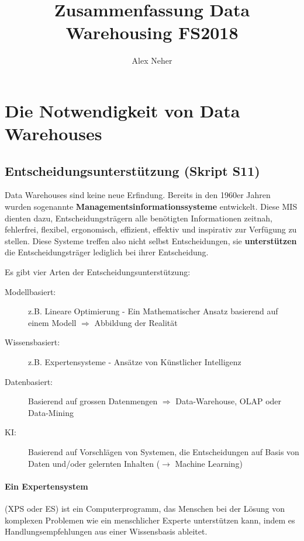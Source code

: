 \documentclass[a4paper, 11pt]{article}
\begin{document}
\title{Zusammenfassung Data Warehousing FS2018}
\author{Alex Neher}
\maketitle

\tableofcontents
\newpage

\graphicspath{{./Pictures/}}

\section{Die Notwendigkeit von Data Warehouses}
\subsection{Entscheidungsunterstützung (Skript S11)}
Data Warehouses sind keine neue Erfindung. Bereits in den 1960er Jahren wurden sogenannte \textbf{Managementsinformationssysteme} entwickelt. Diese MIS dienten dazu, Entscheidungsträgern alle benötigten Informationen zeitnah, fehlerfrei, flexibel, ergonomisch, effizient, effektiv und inspirativ zur Verfügung zu stellen. Diese Systeme treffen also nicht selbst Entscheidungen, sie \textbf{unterstützen} die Entscheidungsträger lediglich bei ihrer Entscheidung.

Es gibt vier Arten der Entscheidungsunterstützung:

\begin{description}
	\item [Modellbasiert:] z.B. Lineare Optimierung - Ein Mathematischer Ansatz basierend auf einem Modell $\Longrightarrow$ Abbildung der Realität
	\item [Wissensbasiert: ] z.B. Expertensysteme - Ansätze von Künstlicher Intelligenz
	\item [Datenbasiert: ] Basierend auf grossen Datenmengen $\Longrightarrow$ Data-Warehouse, OLAP oder Data-Mining
	\item [KI: ] Basierend auf Vorschlägen von Systemen, die Entscheidungen auf Basis von Daten und/oder gelernten Inhalten ($\longrightarrow$ Machine Learning)
\end{description}


\paragraph{Ein Expertensystem}(XPS oder ES) ist ein Computerprogramm, das Menschen bei der Lösung von komplexen Problemen wie ein menschlicher Experte unterstützen kann, indem es Handlungsempfehlungen aus einer Wissensbasis ableitet.
\end{document}

